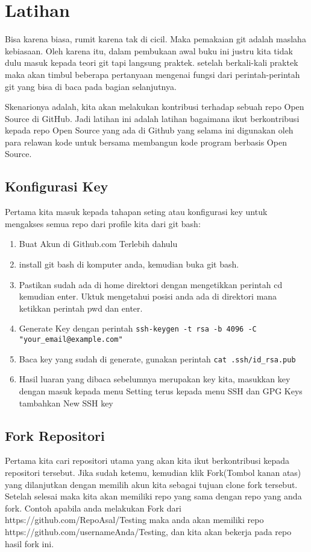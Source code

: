 \section{Latihan}
Bisa karena biasa, rumit karena tak di cicil. Maka pemakaian git adalah maslaha kebiasaan. Oleh karena itu, dalam pembukaan awal buku ini justru kita tidak dulu masuk kepada teori git tapi langsung praktek. setelah berkali-kali praktek maka akan timbul beberapa pertanyaan mengenai fungsi dari perintah-perintah git yang bisa di baca pada bagian selanjutnya.

Skenarionya adalah, kita akan melakukan kontribusi terhadap sebuah repo Open Source di GitHub. Jadi latihan ini adalah latihan bagaimana ikut berkontribusi kepada repo Open Source yang ada di Github yang selama ini digunakan oleh para relawan kode untuk bersama membangun kode program berbasis Open Source. 
\subsection{Konfigurasi Key}
Pertama kita masuk kepada tahapan seting atau konfigurasi key untuk mengakses semua repo dari profile kita dari git bash:
\begin{enumerate}
\item Buat Akun di Github.com Terlebih dahulu
\item install git bash di komputer anda, kemudian buka git bash.
\item Pastikan sudah ada di home direktori dengan mengetikkan perintah cd kemudian enter. Uktuk mengetahui posisi anda ada di direktori mana ketikkan perintah pwd dan enter.
\item Generate Key dengan perintah 
\verb|ssh-keygen -t rsa -b 4096 -C "your_email@example.com"|
\item Baca key yang sudah di generate, gunakan perintah 
\verb|cat .ssh/id_rsa.pub|
\item Hasil luaran yang dibaca sebelumnya merupakan key kita, masukkan key dengan masuk kepada menu Setting terus kepada menu SSH dan GPG Keys tambahkan New SSH key
\end{enumerate}

\subsection{Fork Repositori}
Pertama kita cari repositori utama yang akan kita ikut berkontribusi kepada repositori tersebut. Jika sudah ketemu, kemudian klik Fork(Tombol kanan atas) yang dilanjutkan dengan memilih akun kita sebagai tujuan clone fork tersebut. Setelah selesai maka kita akan memiliki repo yang sama dengan repo yang anda fork. Contoh apabila anda melakukan Fork dari https://github.com/RepoAsal/Testing maka anda akan memiliki repo https://github.com/usernameAnda/Testing, dan kita akan bekerja pada repo hasil fork ini. 

